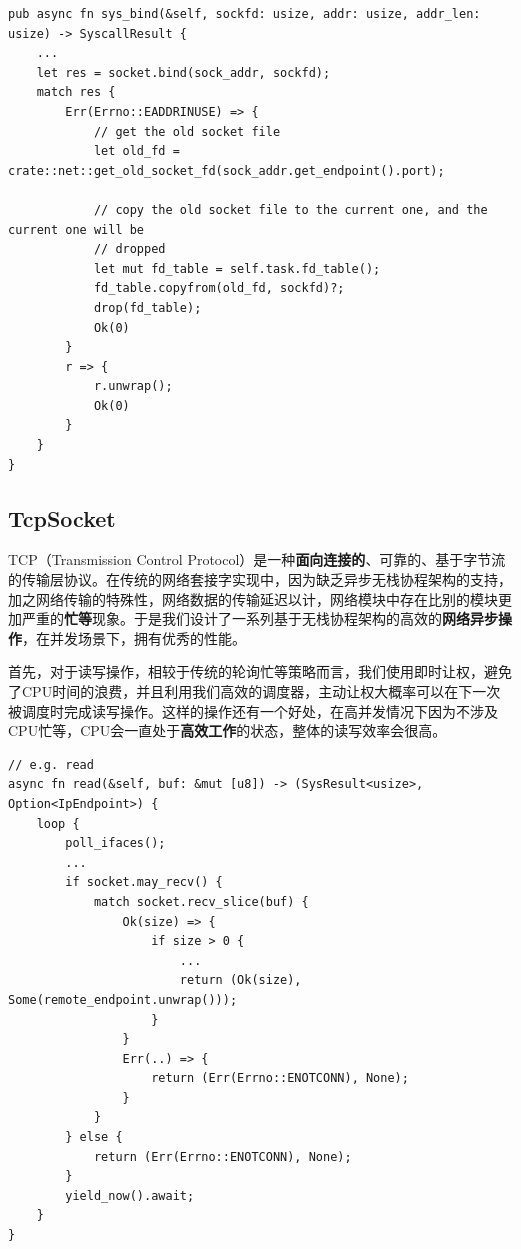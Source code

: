 \documentclass{article}
\begin{document}
\begin{lstlisting}
pub async fn sys_bind(&self, sockfd: usize, addr: usize, addr_len: usize) -> SyscallResult {
    ...
    let res = socket.bind(sock_addr, sockfd);
    match res {
        Err(Errno::EADDRINUSE) => {
            // get the old socket file
            let old_fd = crate::net::get_old_socket_fd(sock_addr.get_endpoint().port);
    
            // copy the old socket file to the current one, and the current one will be
            // dropped
            let mut fd_table = self.task.fd_table();
            fd_table.copyfrom(old_fd, sockfd)?;
            drop(fd_table);
            Ok(0)
        }
        r => {
            r.unwrap();
            Ok(0)
        }
    }
}
\end{lstlisting}

\subsection{TcpSocket}
TCP（Transmission Control Protocol）是一种\textbf{面向连接的}、可靠的、基于字节流的传输层协议。在传统的网络套接字实现中，因为缺乏异步无栈协程架构的支持，加之网络传输的特殊性，网络数据的传输延迟以计，网络模块中存在比别的模块更加严重的\textbf{忙等}现象。于是我们设计了一系列基于无栈协程架构的高效的\textbf{网络异步操作}，在并发场景下，拥有优秀的性能。

首先，对于读写操作，相较于传统的轮询忙等策略而言，我们使用即时让权，避免了CPU时间的浪费，并且利用我们高效的调度器，主动让权大概率可以在下一次被调度时完成读写操作。这样的操作还有一个好处，在高并发情况下因为不涉及CPU忙等，CPU会一直处于\textbf{高效工作}的状态，整体的读写效率会很高。

\begin{lstlisting}
// e.g. read
async fn read(&self, buf: &mut [u8]) -> (SysResult<usize>, Option<IpEndpoint>) {
    loop {
        poll_ifaces();
        ...
        if socket.may_recv() {
            match socket.recv_slice(buf) {
                Ok(size) => {
                    if size > 0 {
                        ...
                        return (Ok(size), Some(remote_endpoint.unwrap()));
                    }
                }
                Err(..) => {
                    return (Err(Errno::ENOTCONN), None);
                }
            }
        } else {
            return (Err(Errno::ENOTCONN), None);
        }
        yield_now().await;
    }
}
\end{lstlisting}
\end{document}

